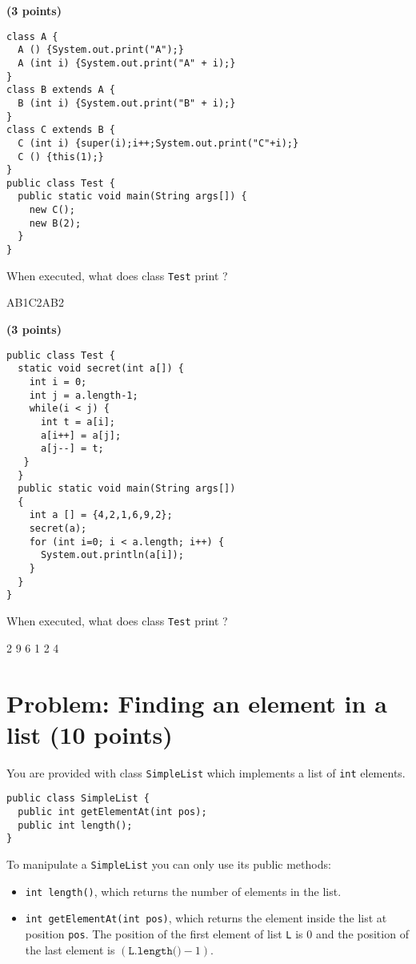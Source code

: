 \documentclass[]{exercices}
\begin{document}
\begin{question} \textbf{(3 points)}
\begin{verbatim}
class A {
  A () {System.out.print("A");}
  A (int i) {System.out.print("A" + i);}
}
class B extends A {
  B (int i) {System.out.print("B" + i);}
}
class C extends B {
  C (int i) {super(i);i++;System.out.print("C"+i);}
  C () {this(1);}
}
public class Test {
  public static void main(String args[]) {
    new C();
    new B(2);
  }
}
\end{verbatim}

When executed, what does class \verb!Test! print ?
\begin{correction}
AB1C2AB2
\end{correction}
\end{question}

\begin{question} \textbf{(3 points)}
\begin{verbatim}
public class Test {
  static void secret(int a[]) {
    int i = 0;
    int j = a.length-1;
    while(i < j) {
      int t = a[i];
      a[i++] = a[j];
      a[j--] = t;
   }
  }
  public static void main(String args[])
  {
    int a [] = {4,2,1,6,9,2};
    secret(a);
    for (int i=0; i < a.length; i++) {
      System.out.println(a[i]);
    }
  }
}
\end{verbatim}

When executed, what does class \verb!Test! print ?
\begin{correction}
2
9
6
1
2
4
\end{correction}
\end{question}

\section{Problem: Finding an element in a list (10 points)}
You are provided with class \verb!SimpleList! which
implements a list of \verb!int! elements.
\begin{verbatim}
public class SimpleList {
  public int getElementAt(int pos);
  public int length();
}
\end{verbatim}

To manipulate a \verb!SimpleList! you can only use its public methods:
\begin{itemize}
  \item \verb!int length()!, which returns the number of elements
    in the list.
  \item \verb!int getElementAt(int pos)!, which returns the
    element inside the list at position \verb!pos!.
    The position of the first element of list \verb!L! is $0$ and the
    position of the last element is $(\texttt{L.length()} - 1)$.
\end{itemize}
\end{document}
